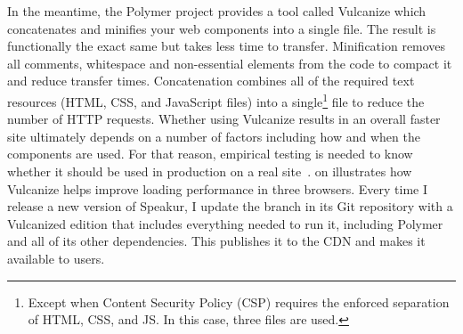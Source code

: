 In the meantime, the Polymer project provides a tool called Vulcanize which concatenates and minifies your web components into a single file.
The result is functionally the exact same but takes less time to transfer.
Minification removes all comments, whitespace and non-essential elements from the code to compact it and reduce transfer times.
Concatenation combines all of the required text resources (HTML, CSS, and JavaScript files) into a 
single\footnote{Except when Content Security Policy (CSP) requires the enforced separation of HTML, CSS, and JS. In this case, three files are used.}
file to reduce the number of HTTP requests.
Whether using Vulcanize results in an overall faster site ultimately depends on a number of factors including how and when the components are used.
For that reason, empirical testing is needed to know whether it should be used in production on a real site~\cite{polymercontributors2015-a}.
 on  illustrates how Vulcanize helps improve loading performance in three browsers.
Every time I release a new version of Speakur, I update the  branch in its Git repository with a Vulcanized edition that includes everything needed to run it, including Polymer and all of its other dependencies.
This publishes it to the  CDN and makes it available to users.

